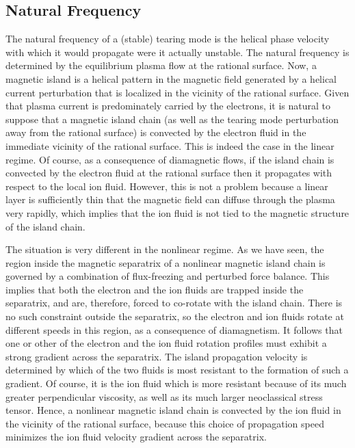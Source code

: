 \documentclass[12pt,prb,aps]{revtex4-1}
\begin{document}
\subsection{Natural Frequency}\label{natural}
The natural frequency of a (stable) tearing mode is
the helical phase velocity with which it would propagate
were it actually unstable.\cite{rfa} The natural frequency
is determined by the equilibrium plasma flow at the
rational surface. Now, a magnetic island is a helical
pattern in the magnetic field  generated by a helical current perturbation that is localized in the
vicinity of the rational surface.
Given that plasma current is predominately carried by the
electrons, it is natural to suppose that a magnetic
island chain (as well as the tearing mode perturbation
away from the rational surface)  is convected by the
electron fluid in the immediate vicinity of the rational
surface. This is indeed the case in the linear regime.\cite{ara} Of course, as a consequence of diamagnetic flows, if the island chain is
convected by the electron fluid at the rational surface then it propagates with respect to the local ion fluid. However, this is not a
problem because a linear layer is sufficiently thin that the magnetic field can diffuse through the plasma very rapidly, which implies that
the ion fluid is not tied to the magnetic structure of the island chain. 

The situation is very different in the nonlinear regime. 
As we have seen, the region inside the magnetic separatrix of a nonlinear magnetic island chain is governed by a combination of flux-freezing and perturbed force balance.
This implies that both the electron and the ion fluids are trapped inside the separatrix, and are, therefore,  forced to co-rotate with the island chain. There
is no such constraint outside the separatrix, so the electron and ion fluids rotate at different speeds in this region,
as a consequence of diamagnetism.  It follows that one or other of the electron and the ion fluid rotation profiles must exhibit a strong gradient across
the separatrix. The island propagation velocity is determined by which of the two fluids is most resistant to the formation of such a gradient. 
Of course, it is the ion fluid which is more resistant because of its much greater perpendicular viscosity,\cite{nl1,wat} as well as its much larger 
neoclassical stress tensor.\cite{nl2} Hence, a nonlinear magnetic island chain is convected by the ion fluid in the vicinity of the rational
surface, because this choice of propagation speed minimizes the ion fluid velocity gradient across the separatrix.
\end{document}
